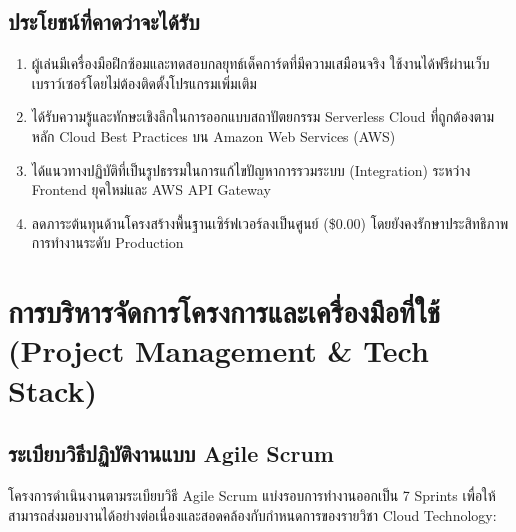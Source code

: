\documentclass[12pt,a4paper]{article}
\begin{document}
\subsection{ประโยชน์ที่คาดว่าจะได้รับ}
\begin{enumerate}[leftmargin=1.5em, itemsep=2pt]
  \item ผู้เล่นมีเครื่องมือฝึกซ้อมและทดสอบกลยุทธ์เด็คการ์ดที่มีความเสมือนจริง ใช้งานได้ฟรีผ่านเว็บเบราว์เซอร์โดยไม่ต้องติดตั้งโปรแกรมเพิ่มเติม
  \item ได้รับความรู้และทักษะเชิงลึกในการออกแบบสถาปัตยกรรม Serverless Cloud ที่ถูกต้องตามหลัก Cloud Best Practices บน Amazon Web Services (AWS)
  \item ได้แนวทางปฏิบัติที่เป็นรูปธรรมในการแก้ไขปัญหาการรวมระบบ (Integration) ระหว่าง Frontend ยุคใหม่และ AWS API Gateway
  \item ลดภาระต้นทุนด้านโครงสร้างพื้นฐานเซิร์ฟเวอร์ลงเป็นศูนย์ (\$0.00) โดยยังคงรักษาประสิทธิภาพการทำงานระดับ Production
\end{enumerate}

\newpage

\section{การบริหารจัดการโครงการและเครื่องมือที่ใช้ (Project Management \& Tech Stack)}

\subsection{ระเบียบวิธีปฏิบัติงานแบบ Agile Scrum}
โครงการดำเนินงานตามระเบียบวิธี Agile Scrum แบ่งรอบการทำงานออกเป็น 7 Sprints เพื่อให้สามารถส่งมอบงานได้อย่างต่อเนื่องและสอดคล้องกับกำหนดการของรายวิชา Cloud Technology:
\end{document}
